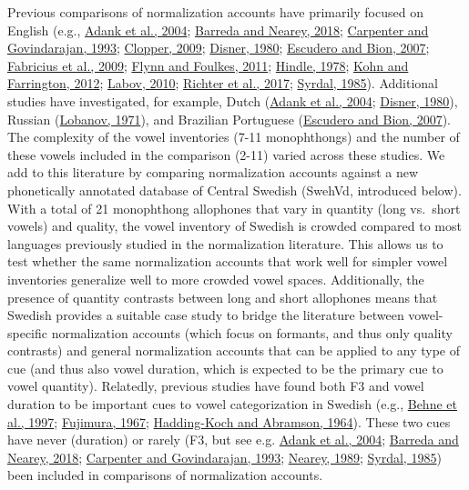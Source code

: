 \documentclass[utf8]{frontiersSCNS}
\begin{document}
Previous comparisons of normalization accounts have primarily focused on English (e.g., \protect\hyperlink{ref-adank2004}{Adank et al., 2004}; \protect\hyperlink{ref-barreda2018a}{Barreda and Nearey, 2018}; \protect\hyperlink{ref-carpenter1993}{Carpenter and Govindarajan, 1993}; \protect\hyperlink{ref-clopper2009}{Clopper, 2009}; \protect\hyperlink{ref-disner1980}{Disner, 1980}; \protect\hyperlink{ref-escudero2007}{Escudero and Bion, 2007}; \protect\hyperlink{ref-fabricius2009}{Fabricius et al., 2009}; \protect\hyperlink{ref-Flynn2011}{Flynn and Foulkes, 2011}; \protect\hyperlink{ref-hindle1978}{Hindle, 1978}; \protect\hyperlink{ref-kohn2012a}{Kohn and Farrington, 2012}; \protect\hyperlink{ref-labov2010}{Labov, 2010}; \protect\hyperlink{ref-richter2017}{Richter et al., 2017}; \protect\hyperlink{ref-syrda1985}{Syrdal, 1985}). Additional studies have investigated, for example, Dutch (\protect\hyperlink{ref-adank2004}{Adank et al., 2004}; \protect\hyperlink{ref-disner1980}{Disner, 1980}), Russian (\protect\hyperlink{ref-lobanov1971}{Lobanov, 1971}), and Brazilian Portuguese (\protect\hyperlink{ref-escudero2007}{Escudero and Bion, 2007}). The complexity of the vowel inventories (7-11 monophthongs) and the number of these vowels included in the comparison (2-11) varied across these studies. We add to this literature by comparing normalization accounts against a new phonetically annotated database of Central Swedish (SwehVd, introduced below). With a total of 21 monophthong allophones that vary in quantity (long vs.~short vowels) and quality, the vowel inventory of Swedish is crowded compared to most languages previously studied in the normalization literature. This allows us to test whether the same normalization accounts that work well for simpler vowel inventories generalize well to more crowded vowel spaces. Additionally, the presence of quantity contrasts between long and short allophones means that Swedish provides a suitable case study to bridge the literature between vowel-specific normalization accounts (which focus on formants, and thus only quality contrasts) and general normalization accounts that can be applied to any type of cue (and thus also vowel duration, which is expected to be the primary cue to vowel quantity). Relatedly, previous studies have found both F3 and vowel duration to be important cues to vowel categorization in Swedish (e.g., \protect\hyperlink{ref-behne1997}{Behne et al., 1997}; \protect\hyperlink{ref-fujimura1967}{Fujimura, 1967}; \protect\hyperlink{ref-haddingkoch1964}{Hadding-Koch and Abramson, 1964}). These two cues have never (duration) or rarely (F3, but see e.g. \protect\hyperlink{ref-adank2004}{Adank et al., 2004}; \protect\hyperlink{ref-barreda2018a}{Barreda and Nearey, 2018}; \protect\hyperlink{ref-carpenter1993}{Carpenter and Govindarajan, 1993}; \protect\hyperlink{ref-nearey1989}{Nearey, 1989}; \protect\hyperlink{ref-syrda1985}{Syrdal, 1985}) been included in comparisons of normalization accounts.
\end{document}
